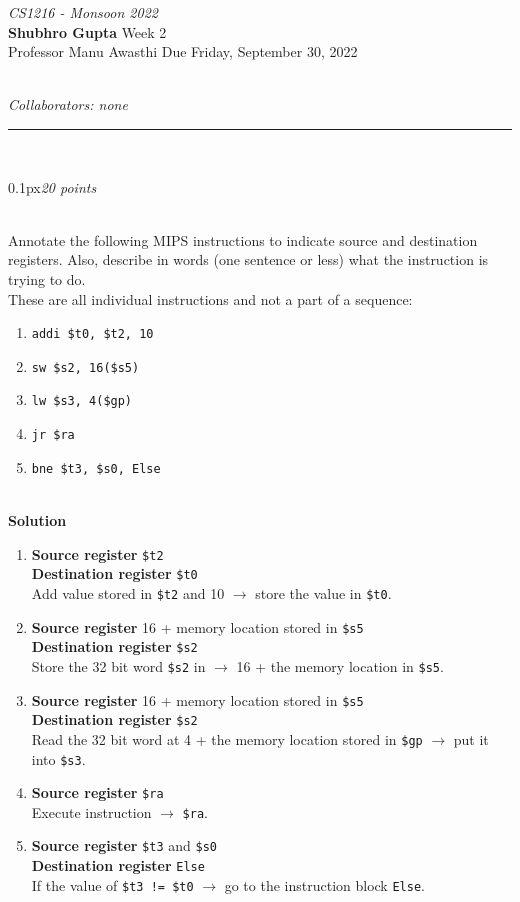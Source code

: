 \documentclass[11pt]{article}
\newcommand{\problem}[2]{\begin{adjustwidth}{0.1px}\noindent \framebox[1.2\width]{\large Problem #1}\hfill \emph{#2} \end{adjustwidth} \bigskip\\}
\newcommand{\code}[1]{{\texttt{#1}}}
\newcommand{\lesgo}[5]{
\begin{large}
\emph{#1}\smallskip \\
\textbf{Shubhro Gupta} \hfill Week #2\smallskip \\
Professor #3 \hfill Due #4\\
\end{large} \medskip \\
{\emph{Collaborators: #5}}\\
\hrule
\vspace{50px}
\\
}
\begin{document}
\lesgo{CS1216 - Monsoon 2022}{2}{Manu Awasthi}{Friday, September 30, 2022}{none}

\problem{1}{20 points}
Annotate the following MIPS instructions to indicate source and destination registers. Also, describe in words (one sentence or less) what the instruction is trying to do.
\\ These are all individual instructions and not a part of a sequence:
\begin{enumerate}
	\item
	      \code{addi \$t0, \$t2, 10}
	\item
	      \code{sw \$s2, 16(\$s5)}
	\item
	      \code{lw \$s3, 4(\$gp)}
	\item
	      \code{jr \$ra}
	\item
	      \code{bne \$t3, \$s0, Else}
\end{enumerate}
\bigskip \\
\textbf{Solution}
\begin{enumerate}
	\item
	      \textbf{Source register} \code{\$t2}\\
	      \textbf{Destination register} \code{\$t0}
	      \medskip\\
	      Add value stored in \code{\$t2} and 10 $\rightarrow$ store the value in \code{\$t0}.

	\item
	      \textbf{Source register} 16 + memory location stored in \code{\$s5}\\
	      \textbf{Destination register} \code{\$s2}
	      \medskip\\
	      Store the 32 bit word \code{\$s2} in $\rightarrow$ 16 + the memory location in \code{\$s5}.

	\item
	      \textbf{Source register} 16 + memory location stored in \code{\$s5}\\
	      \textbf{Destination register} \code{\$s2}
	      \medskip\\
	      Read the 32 bit word at 4 + the memory location stored in \code{\$gp} $\rightarrow$ put it into \code{\$s3}.

	\item
	      \textbf{Source register} \code{\$ra}
	      \medskip\\
	      Execute instruction $\rightarrow$ \code{\$ra}.

	\item
	      \textbf{Source register} \code{\$t3} and \code{\$s0}\\
	      \textbf{Destination register} \code{Else}
	      \medskip\\
	      If the value of \code{\$t3 != \$t0} $\rightarrow$
	      go to the instruction block \code{Else}.

\end{enumerate}
\end{document}

